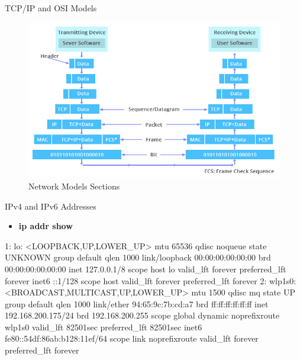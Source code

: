 \cprotect\note{

}

\begin{frame}
   {TCP/IP and OSI Models}
      \begin{figure}[H]
         \includegraphics[width=6.0in]{IMAGES/models}
         \caption{Network Models Sections}
      \end{figure}

\end{frame}

\cprotect\note{

}

\begin{frame}
   {IPv4 and IPv6 Addresses}
      \begin{itemize}
	      \item \textbf{ip addr show}
      \end{itemize}
      \begin{raw}
1: lo: <LOOPBACK,UP,LOWER_UP> mtu 65536 qdisc noqueue state UNKNOWN group 
	      default qlen 1000
    link/loopback 00:00:00:00:00:00 brd 00:00:00:00:00:00
    inet 127.0.0.1/8 scope host lo
       valid_lft forever preferred_lft forever
    inet6 ::1/128 scope host
       valid_lft forever preferred_lft forever
2: wlp1s0: <BROADCAST,MULTICAST,UP,LOWER_UP> mtu 1500 qdisc mq state UP 
	      group default qlen 1000
    link/ether 94:65:9c:7b:cd:a7 brd ff:ff:ff:ff:ff:ff
    inet 192.168.200.175/24 brd 192.168.200.255 scope global dynamic 
	      noprefixroute wlp1s0
       valid_lft 82501sec preferred_lft 82501sec
    inet6 fe80::54df:86ab:b128:11ef/64 scope link noprefixroute
       valid_lft forever preferred_lft forever

      \end{raw}

\end{frame}

\cprotect\note{

}

